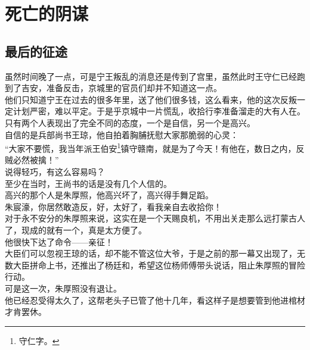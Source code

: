 \section{死亡的阴谋}
\ifnum{}
	\begin{multicols}{\theparacolNo}
\fi
\subsection{最后的征途}
虽然时间晚了一点，可是宁王叛乱的消息还是传到了宫里，虽然此时王守仁已经跑到了吉安，准备反击，京城里的官员们却并不知道这一点。\\

他们只知道宁王在过去的很多年里，送了他们很多钱，这么看来，他的这次反叛一定计划严密，难以平定。于是乎京城中一片慌乱，收拾行李准备溜走的大有人在。\\

只有两个人表现出了完全不同的态度，一个是自信，另一个是高兴。\\

自信的是兵部尚书王琼，他自拍着胸脯抚慰大家那脆弱的心灵：\\

“大家不要慌，我当年派王伯安\footnote{守仁字。}镇守赣南，就是为了今天！有他在，数日之内，反贼必然被擒！”\\

说得轻巧，有这么容易吗？\\

至少在当时，王尚书的话是没有几个人信的。\\

高兴的那个人是朱厚照，他高兴坏了，高兴得手舞足蹈。\\

朱宸濠，你居然敢造反，好，太好了，看我亲自去收拾你！\\

对于永不安分的朱厚照来说，这实在是一个天赐良机，不用出关走那么远打蒙古人了，现成的就有一个，真是太方便了。\\

他很快下达了命令——亲征！\\

大臣们可以忽视王琼的话，却不能不管这位大爷，于是之前的那一幕又出现了，无数大臣拼命上书，还推出了杨廷和，希望这位杨师傅带头说话，阻止朱厚照的冒险行动。\\

可是这一次，朱厚照没有退让。\\

他已经忍受得太久了，这帮老头子已管了他十几年，看这样子是想要管到他进棺材才肯罢休。\\


\end{multicols}
